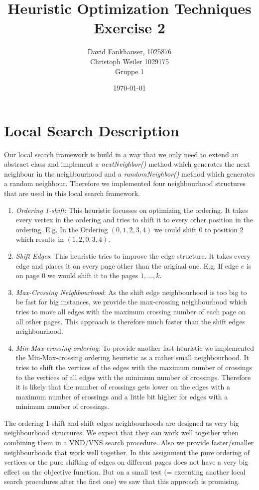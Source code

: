 \documentclass[11pt]{article}
\title{\textbf{Heuristic Optimization Techniques }\\Exercise 2}
\author{David Fankhauser, 1025876\\ Christoph Weiler 1029175\\Gruppe 1}
\date{\today}
\begin{document}
\lstset{language=C++}
\maketitle
 
\section{Local Search Description}
Our local search framework is build in a way that we only need to extend an abstract class and implement a \textit{nextNeighbor()} method which generates the next neighbour in the neighbourhood and a \textit{randomNeighbor()} method which generates a random neighbour.
Therefore we implemented four neighbourhood structures that are used in this local search framework.

\begin{enumerate}
	\item \textit{Ordering 1-shift}: This heuristic focusses on optimizing the ordering. It takes every vertex in the ordering and tries to shift it to every other position in the ordering.
		E.g. In the Ordering $(0, 1, 2, 3, 4)$ we could shift $0$ to position $2$ which results in $(1, 2, 0, 3, 4)$.
	\item \textit{Shift Edges}: This heuristic tries to improve the edge structure. It takes every edge and places it on every page other than the original one.
		E.g. If edge $e$ is on page $0$ we would shift it to the pages $1, \dots, k$.
	\item \textit{Max-Crossing Neighbourhood}: As the shift edge neighbourhood is too big to be fast for big instances, 
		we provide the max-crossing neighbourhood which tries to move all edges with the maximum crossing number of each page on all other pages.
		This approach is therefore much faster than the shift edges neighbourhood.
	\item \textit{Min-Max-crossing ordering}: To provide another fast heuristic we implemented the Min-Max-crossing ordering heuristic as a rather small neighbourhood.
		It tries to shift the vertices of the edges with the maximum number of crossings to the vertices of all edges with the minimum number of crossings.
		Therefore it is likely that the number of crossings gets lower on the edges with a maximum number of crossings and a little bit higher for edges with a minimum number of crossings.
\end{enumerate}

The ordering 1-shift and shift edges neighbourhoods are designed as very big neighbourhood structures.
We expect that they can work well together when combining them in a VND/VNS search procedure.
Also we provide faster/smaller neighbourhoods that work well together.
In this assignment the pure ordering of vertices or the pure shifting of edges on different pages does not have a very big effect on the objective function.
But on a small test (= executing another local search procedures after the first one) we saw that this approach is promising.
\end{document}
